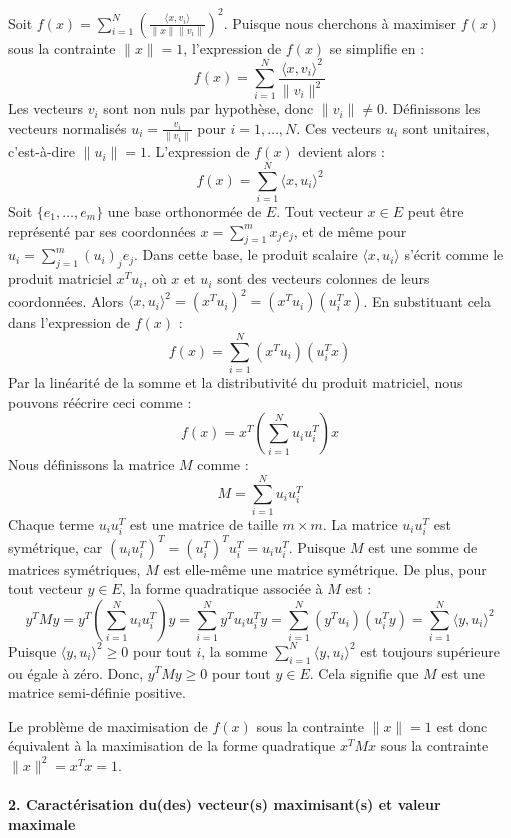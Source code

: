 \documentclass[11pt,a4paper]{report}
\begin{document}
Soit
\(f(x) = \sum_{i=1}^N \left(\frac{\langle x, v_i \rangle}{\|x\| \|v_i\|}\right)^2\).
Puisque nous cherchons à maximiser \(f(x)\) sous la contrainte
\(\|x\|=1\), l'expression de \(f(x)\) se simplifie en :
\[ f(x) = \sum_{i=1}^N \frac{\langle x, v_i \rangle^2}{\|v_i\|^2} \] Les
vecteurs \(v_i\) sont non nuls par hypothèse, donc \(\|v_i\| \neq 0\).
Définissons les vecteurs normalisés \(u_i = \frac{v_i}{\|v_i\|}\) pour
\(i=1, \dots, N\). Ces vecteurs \(u_i\) sont unitaires, c'est-à-dire
\(\|u_i\|=1\). L'expression de \(f(x)\) devient alors :
\[ f(x) = \sum_{i=1}^N \langle x, u_i \rangle^2 \] Soit
\(\{e_1, \dots, e_m\}\) une base orthonormée de \(E\). Tout vecteur
\(x \in E\) peut être représenté par ses coordonnées
\(x = \sum_{j=1}^m x_j e_j\), et de même pour
\(u_i = \sum_{j=1}^m (u_i)_j e_j\). Dans cette base, le produit scalaire
\(\langle x, u_i \rangle\) s'écrit comme le produit matriciel
\(x^T u_i\), où \(x\) et \(u_i\) sont des vecteurs colonnes de leurs
coordonnées. Alors
\(\langle x, u_i \rangle^2 = (x^T u_i)^2 = (x^T u_i)(u_i^T x)\). En
substituant cela dans l'expression de \(f(x)\) :
\[ f(x) = \sum_{i=1}^N (x^T u_i)(u_i^T x) \] Par la linéarité de la
somme et la distributivité du produit matriciel, nous pouvons réécrire
ceci comme : \[ f(x) = x^T \left(\sum_{i=1}^N u_i u_i^T\right) x \] Nous
définissons la matrice \(M\) comme : \[ M = \sum_{i=1}^N u_i u_i^T \]
Chaque terme \(u_i u_i^T\) est une matrice de taille \(m \times m\). La
matrice \(u_i u_i^T\) est symétrique, car
\((u_i u_i^T)^T = (u_i^T)^T u_i^T = u_i u_i^T\). Puisque \(M\) est une
somme de matrices symétriques, \(M\) est elle-même une matrice
symétrique. De plus, pour tout vecteur \(y \in E\), la forme quadratique
associée à \(M\) est :
\[ y^T M y = y^T \left(\sum_{i=1}^N u_i u_i^T\right) y = \sum_{i=1}^N y^T u_i u_i^T y = \sum_{i=1}^N (y^T u_i)(u_i^T y) = \sum_{i=1}^N \langle y, u_i \rangle^2 \]
Puisque \(\langle y, u_i \rangle^2 \ge 0\) pour tout \(i\), la somme
\(\sum_{i=1}^N \langle y, u_i \rangle^2\) est toujours supérieure ou
égale à zéro. Donc, \(y^T M y \ge 0\) pour tout \(y \in E\). Cela
signifie que \(M\) est une matrice semi-définie positive.

Le problème de maximisation de \(f(x)\) sous la contrainte \(\|x\|=1\)
est donc équivalent à la maximisation de la forme quadratique
\(x^T M x\) sous la contrainte \(\|x\|^2 = x^T x = 1\).

\hypertarget{caractuxe9risation-dudes-vecteurs-maximisants-et-valeur-maximale}{%
\paragraph{2. Caractérisation du(des) vecteur(s) maximisant(s) et valeur
maximale}\label{caractuxe9risation-dudes-vecteurs-maximisants-et-valeur-maximale}}
\end{document}
